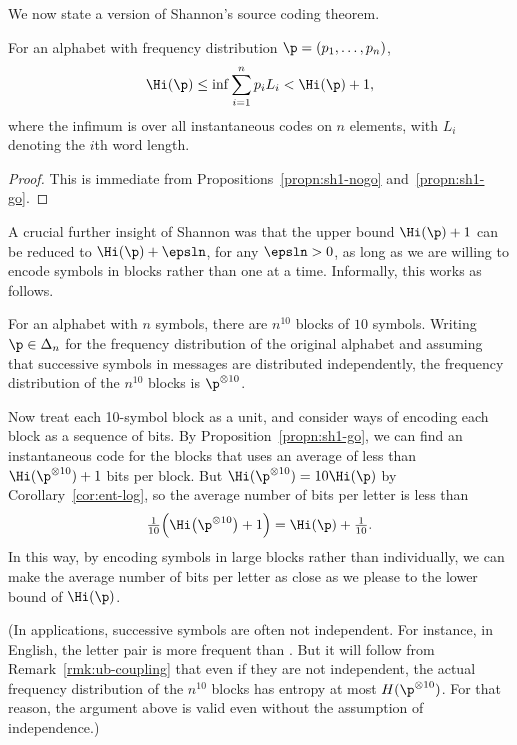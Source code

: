 We now state a version of Shannon's source coding theorem.

\begin{thm}[Shannon]%
% 
For an alphabet with frequency distribution $\p = (p_1, \ldots, p_n)$,
\[
\Hi(\p) \leq \inf \sum_{i = 1}^n p_i L_i < \Hi(\p) + 1,
\]
where the infimum is over all instantaneous codes on $n$ elements, with
$L_i$ denoting the $i$th word length.
\end{thm}

\begin{proof}
This is immediate from Propositions~\ref{propn:sh1-nogo}
and~\ref{propn:sh1-go}. 
\end{proof}

A crucial further insight of Shannon was that the upper bound $\Hi(\p) + 1$
can be reduced to $\Hi(\p) + \epsln$, for any $\epsln > 0$, as long as we
are willing to encode symbols in blocks rather than one at a
time.  Informally, this works as follows.

For an alphabet with $n$ symbols, there are $n^{10}$ blocks of $10$
symbols.  Writing $\p \in \Delta_n$ for the frequency distribution of the
original alphabet and assuming that successive symbols in messages are
distributed independently, the frequency distribution of the $n^{10}$
blocks is $\p^{\otimes 10}$.  

Now treat each 10-symbol block as a unit, and consider ways of encoding
each block as a sequence of bits.  By Proposition~\ref{propn:sh1-go}, we
can find an instantaneous code for the blocks that uses an average of less
than $\Hi(\p^{\otimes 10}) + 1$ bits per block.  But $\Hi(\p^{\otimes 10})
= 10\Hi(\p)$ by Corollary~\ref{cor:ent-log}, so the average number of bits
per letter is less than
\[
\tfrac{1}{10} \Bigl( \Hi\bigl(\p^{\otimes 10}\bigr) + 1 \Bigr)
=
\Hi(\p) + \tfrac{1}{10}.
\]
In this way, by encoding symbols in large blocks rather than individually,
we can make the average number of bits per letter as close as we please to
the lower bound of $\Hi(\p)$.

(In applications, successive symbols are often not independent.  For
instance, in English, the letter pair  is more frequent than
.  But it will follow from Remark~\ref{rmk:ub-coupling} that even if
they are not independent, the actual frequency distribution of the $n^{10}$
blocks has entropy at most $H(\p^{\otimes 10})$.  For that reason, the
argument above is valid even without the assumption of
independence.) 
\pagebreak

